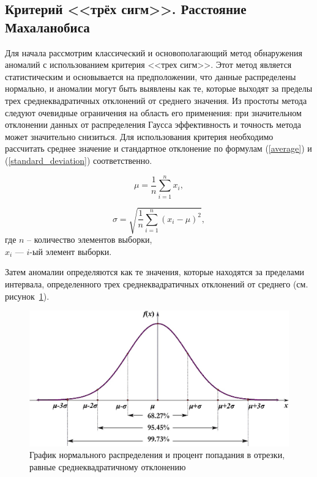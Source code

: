 \subsection{Критерий <<трёх сигм>>. Расстояние Махаланобиса}

Для начала рассмотрим классический и основополагающий метод обнаружения аномалий с использованием критерия <<трех сигм>>. Этот метод является статистическим и основывается на предположении, что данные распределены нормально, и аномалии могут быть выявлены как те, которые выходят за пределы трех среднеквадратичных отклонений от среднего значения. Из простоты метода следуют очевидные ограничения на область его применения: при значительном отклонении данных от распределения Гаусса эффективность и точность метода может значительно снизиться. Для использования критерия необходимо рассчитать среднее значение и стандартное отклонение по формулам (\ref{average}) и (\ref{standard_deviation}) соответственно.

\begin{equation}\label{average}
    \mu = \frac{1}{n} \sum\limits_{i = 1}^{n}x_i,
\end{equation}

\begin{equation}\label{standard_deviation}
    \sigma = \sqrt{\frac{1}{n} \sum\limits_{i = 1}^{n}(x_i - \mu)^2},
\end{equation}
где $n$ – количество элементов выборки, \\
$x_i$ --- $i$-ый элемент выборки.

Затем аномалии определяются как те значения, которые находятся за пределами интервала, определенного трех среднеквадратичных отклонений от среднего (см. рисунок~\ref{fig:three-sigma}).

\begin{figure}
  \centering
  \includegraphics[scale=0.25]{inc/images/three-sigma.png}
  \caption{График нормального распределения и процент попадания в отрезки, равные среднеквадратичному отклонению \cite{Three-Sigma-Limits}}
  \label{fig:three-sigma}
\end{figure}

